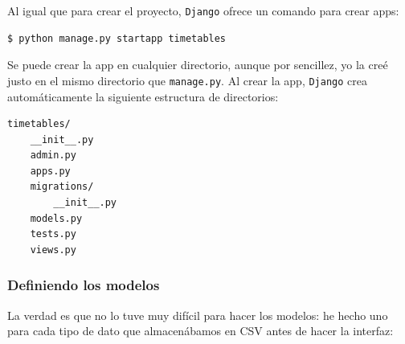 Al igual que para crear el proyecto, \texttt{Django} ofrece un comando para crear apps:

\begin{verbatim}
$ python manage.py startapp timetables
\end{verbatim}

Se puede crear la app en cualquier directorio, aunque por sencillez, yo la creé justo en el mismo directorio que \texttt{manage.py}. Al crear la app, \texttt{Django} crea automáticamente la siguiente estructura de directorios:

\begin{verbatim}
timetables/
    __init__.py
    admin.py
    apps.py
    migrations/
        __init__.py
    models.py
    tests.py
    views.py
\end{verbatim}

\subsubsection{Definiendo los modelos}
La verdad es que no lo tuve muy difícil para hacer los modelos: he hecho uno para cada tipo de dato que almacenábamos en CSV antes de hacer la interfaz:

